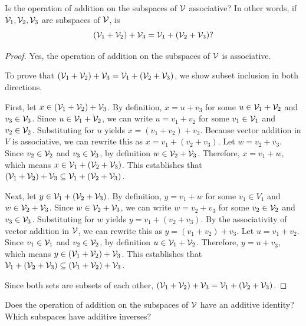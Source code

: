 \begin{question}
	Is the operation of addition on the subspaces of $\mathcal{V}$ associative? In other words, if $\mathcal{V}_1, \mathcal{V}_2, \mathcal{V}_3$ are subspaces of $\mathcal{V}$, is
	\[ (\mathcal{V}_1 + \mathcal{V}_2) + \mathcal{V}_3 = \mathcal{V}_1 + (\mathcal{V}_2 + \mathcal{V}_3)? \]
\end{question}
\begin{proof}
	Yes, the operation of addition on the subspaces of $\mathcal{V}$ is associative.
	
	To prove that $(\mathcal{V}_1 + \mathcal{V}_2) + \mathcal{V}_3 = \mathcal{V}_1 + (\mathcal{V}_2 + \mathcal{V}_3)$, we show subset inclusion in both directions.
	
	First, let $x \in (\mathcal{V}_1 + \mathcal{V}_2) + \mathcal{V}_3$. By definition, $x = u + v_3$ for some $u \in \mathcal{V}_1 + \mathcal{V}_2$ and $v_3 \in \mathcal{V}_3$. 
	Since $u \in \mathcal{V}_1 + \mathcal{V}_2$, we can write $u = v_1 + v_2$ for some $v_1 \in \mathcal{V}_1$ and $v_2 \in \mathcal{V}_2$. 
	Substituting for $u$ yields $x = (v_1 + v_2) + v_3$. 
	Because vector addition in $V$ is associative, we can rewrite this as $x = v_1 + (v_2 + v_3)$. 
	Let $w = v_2 + v_3$. Since $v_2 \in \mathcal{V}_2$ and $v_3 \in \mathcal{V}_3$, by definition $w \in \mathcal{V}_2 + \mathcal{V}_3$. 
	Therefore, $x = v_1 + w$, which means $x \in \mathcal{V}_1 + (\mathcal{V}_2 + \mathcal{V}_3)$. 
	This establishes that $(\mathcal{V}_1 + \mathcal{V}_2) + \mathcal{V}_3 \subseteq \mathcal{V}_1 + (\mathcal{V}_2 + \mathcal{V}_3)$.
	
	Next, let $y \in \mathcal{V}_1 + (\mathcal{V}_2 + \mathcal{V}_3)$. By definition, $y = v_1 + w$ for some $v_1 \in V_1$ and $w \in \mathcal{V}_2 + \mathcal{V}_3$. 
	Since $w \in \mathcal{V}_2 + \mathcal{V}_3$, we can write $w = v_2 + v_3$ for some $v_2 \in \mathcal{V}_2$ and $v_3 \in \mathcal{V}_3$. 
	Substituting for $w$ yields $y = v_1 + (v_2 + v_3)$. 
	By the associativity of vector addition in $\mathcal{V}$, we can rewrite this as $y = (v_1 + v_2) + v_3$. 
	Let $u = v_1 + v_2$. Since $v_1 \in \mathcal{V}_1$ and $v_2 \in \mathcal{V}_2$, by definition $u \in \mathcal{V}_1 + \mathcal{V}_2$. 
	Therefore, $y = u + v_3$, which means $y \in (\mathcal{V}_1 + \mathcal{V}_2) + \mathcal{V}_3$. 
	This establishes that $\mathcal{V}_1 + (\mathcal{V}_2 + \mathcal{V}_3) \subseteq (\mathcal{V}_1 + \mathcal{V}_2) + \mathcal{V}_3$.
	
	Since both sets are subsets of each other, $(\mathcal{V}_1 + \mathcal{V}_2) + \mathcal{V}_3 = \mathcal{V}_1 + (\mathcal{V}_2 + \mathcal{V}_3)$.
\end{proof}
\begin{question}
	Does the operation of addition on the subspaces of $\mathcal{V}$ have an additive identity? Which subspaces have additive inverses?
\end{question}
